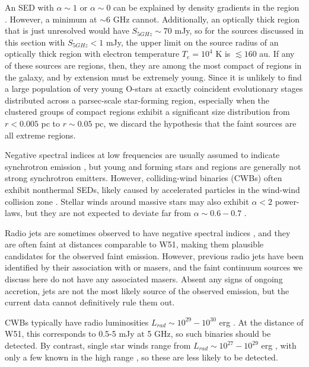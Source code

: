 An SED with $\alpha\sim1$ or $\alpha\sim0$ can be explained by density
gradients in the \hii region \citep{Keto2008a,Galvan-Madrid2009a,Tanaka2016a}.
However, a minimum at $\sim6$ GHz cannot.  Additionally, an optically thick
\hii region that is just unresolved would have $S_{5 GHz} \sim 70$ mJy, so for
the sources discussed in this section with $S_{5 GHz} < 1$ mJy, the upper limit
on the source radius of an optically thick \hii region with electron
temperature $T_e=10^4$ K is $\lesssim160$ au.  If any of these sources are \hii
regions, then, they are among the most compact of \hchii regions in the galaxy,
and by extension must be extremely young.  Since it is unlikely to find a large
population of very young O-stars at exactly coincident evolutionary stages
distributed across a parsec-scale star-forming region, especially when the clustered
groups of compact \hii regions exhibit a significant size distribution from
$r<0.005$ pc to $r\sim0.05$ pc, we discard the hypothesis that the faint sources
are all extreme \hchii regions.

Negative spectral indices at low frequencies are usually assumed to indicate
synchrotron emission \citep{Wilson2009a,Condon2007a}, but young and forming
stars and \hii regions are generally not strong synchrotron emitters.  However,
colliding-wind binaries (CWBs) often exhibit nonthermal SEDs, likely caused by
accelerated particles in the wind-wind collision zone \citep{De-Becker2013a}.
Stellar winds around massive stars may also exhibit $\alpha<2$ power-laws, but
they are not expected to deviate far from $\alpha\sim0.6-0.7$
\citep{Wright1975a,Panagia1975b,Reynolds1986a}.

Radio jets are sometimes observed to have negative spectral indices
\citep{Moscadelli2013a,Moscadelli2016a}, and they are often faint at distances
comparable to W51, making them plausible candidates for the observed faint
emission.  However, previous radio jets have been identified by their
association with \methanol or \water masers, and the faint continuum sources we
discuss here do not have any associated masers.  Absent any signs of ongoing
accretion, jets are not the most likely source of the observed emission, but
the current data cannot definitively rule them out.

CWBs typically have radio luminosities
$L_{rad}\sim10^{29}-10^{30}$ erg \pers \citep{De-Becker2013a}.   At the
distance of W51, this corresponds to 0.5-5 mJy at 5 GHz, so such binaries
should be detected.  By contrast, single star winds range from $L_{rad} \sim
10^{27}-10^{29}$ erg \pers, with only a few known in the high range
\citep{Bieging1989a}, so these are less likely to be detected.

